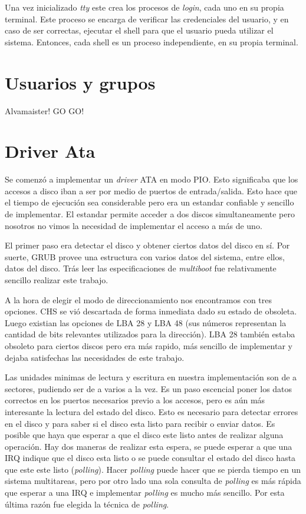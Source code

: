 \documentclass[a4paper,10pt]{article}
\begin{document}
Una vez inicializado \textit{tty} este crea los procesos de \textit{login}, cada uno en su propia terminal.
Este proceso se encarga de verificar las credenciales del usuario, y en caso de ser correctas, ejecutar el shell para que el usuario pueda utilizar el sistema.
Entonces, cada shell es un proceso independiente, en su propia terminal.


\newpage
\section{Usuarios y grupos}
Alvamaister! GO GO!

\newpage
\section{Driver Ata}
    Se comenzó a implementar un \textit{driver} ATA en modo PIO. Esto significaba que los accesos a disco iban a ser
    por medio de puertos de entrada/salida. Esto hace que el tiempo de ejecución sea considerable pero era un estandar
    confiable y sencillo de implementar.
    El estandar permite acceder a dos discos simultaneamente pero nosotros no vimos la necesidad de implementar el 
    acceso a más de uno.
    
    El primer paso era detectar el disco y obtener ciertos datos del disco en sí. Por suerte, GRUB provee una estructura
    con varios datos del sistema, entre ellos, datos del disco. Trás leer las especificaciones de \textit{multiboot}
    fue relativamente sencillo realizar este trabajo.

    A la hora de elegir el modo de direccionamiento nos encontramos con tres opciones. CHS se vió descartada de forma
    inmediata dado su estado de obsoleta. Luego existian las opciones de LBA 28 y LBA 48 (sus números representan
    la cantidad de bits relevantes utilizados para la dirección). LBA 28 también estaba obsoleto para ciertos discos
    pero era más rapido, más sencillo de implementar y dejaba satisfechas las necesidades de este trabajo.

    Las unidades minimas de lectura y escritura en nuestra implementación son de a sectores, pudiendo ser de a
    varios a la vez. Es un paso escencial poner los datos correctos en los puertos necesarios previo a los accesos, pero
    es aún más interesante la lectura del estado del disco. Esto es necesario para detectar errores en el disco
    y para saber si el disco esta listo para recibir o enviar datos. Es posible que haya que esperar a que el disco
    este listo antes de realizar alguna operación. Hay dos maneras de realizar esta espera, se puede esperar a que una IRQ
    indique que el disco esta listo o se puede consultar el estado del disco hasta que este este listo (\textit{polling}).
    Hacer \textit{polling} puede hacer que se pierda tiempo en un sistema multitareas, pero por otro lado una sola
    consulta de \textit{polling} es más rápida que esperar a una IRQ e implementar \textit{polling} es mucho más sencillo.
    Por esta última razón fue elegida la técnica de \textit{polling}.
\newpage
\end{document}
